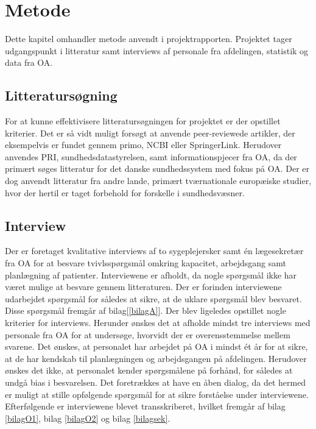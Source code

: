 \chapter{Metode}

Dette kapitel omhandler metode anvendt i projektrapporten. Projektet tager udgangspunkt i litteratur samt interviews af personale fra afdelingen, statistik og data fra OA. 


\section{Litteratursøgning}
For at kunne effektivisere litteratursøgningen for projektet er der opstillet kriterier. Det er så vidt muligt forsøgt at anvende peer-reviewede artikler, der eksempelvis er fundet gennem primo, NCBI eller SpringerLink. Herudover anvendes PRI, sundhedsdatastyrelsen, samt informationspjecer fra OA, da der primært søges litteratur for det danske sundhedssystem med fokus på OA. Der er dog anvendt litteratur fra andre lande, primært tværnationale europæiske studier, hvor der hertil er taget forbehold for forskelle i sundhedsvæsner.


\section{Interview}
Der er foretaget kvalitative interviews af to sygeplejersker samt én lægesekretær fra OA for at besvare tvivlsspørgsmål omkring kapacitet, arbejdsgang samt planlægning af patienter. Interviewene er afholdt, da nogle spørgsmål ikke har været mulige at besvare gennem litteraturen. Der er forinden interviewene udarbejdet spørgsmål for således at sikre, at de uklare spørgsmål blev besvaret. Disse spørgsmål fremgår af bilag[\ref{bilagA}]. Der blev ligeledes opstillet nogle kriterier for interviews. Herunder ønskes det at afholde mindst tre interviews med personale fra OA for at undersøge, hvorvidt der er overensstemmelse mellem svarene. Det ønskes, at personalet har arbejdet på OA i mindst ét år for at sikre, at de har kendskab til planlægningen og arbejdsgangen på afdelingen. Herudover ønskes det ikke, at personalet kender spørgsmålene på forhånd, for således at undgå bias i besvarelsen. Det foretrækkes at have en åben dialog, da det hermed er muligt at stille opfølgende spørgsmål for at sikre forståelse under interviewene. Efterfølgende er interviewene blevet transskriberet, hvilket fremgår af bilag \ref{bilagO1}, bilag \ref{bilagO2} og bilag \ref{bilagsek}.


